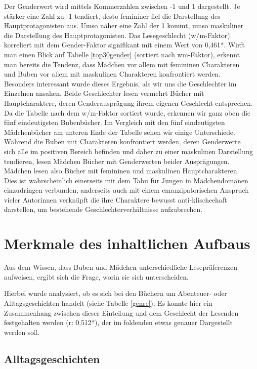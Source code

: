Der Genderwert wird mittels Kommerzahlen zwischen -1 und 1 dargestellt.
Je stärker eine Zahl zu -1 tendiert, desto femininer fiel die
Darstellung des Hauptprotagonisten aus. Umso näher eine Zahl der 1
kommt, umso maskuliner die Darstellung des Hauptprotagonisten. Das
Lesegeschlecht (w/m-Faktor) korreliert mit dem Gender-Faktor signifikant
mit einem Wert von 0,461*. Wirft man einen Blick auf Tabelle
\ref{top30gender} (sortiert nach wm-Faktor), erkennt man bereits die
Tendenz, dass Mädchen vor allem mit femininen Charakteren und Buben vor
allem mit maskulinen Charakteren konfrontiert werden. Besonders
interessant wurde dieses Ergebnis, als wir uns die Geschlechter im
Einzelnen ansahen. Beide Geschlechter lesen vermehrt Bücher mit
Hauptcharaktere, deren Genderausprägung ihrem eigenen Geschlecht
entsprechen. Da die Tabelle nach dem w/m-Faktor sortiert wurde, erkennen
wir ganz oben die fünf eindeutigsten Bubenbücher. Im Vergleich mit den
fünf eindeutigsten Mädchenbücher am unteren Ende der Tabelle sehen wir
einige Unterschiede. Während die Buben mit Charakteren konfrontiert
werden, deren Genderwerte sich alle im positiven Bereich befinden und
daher zu einer maskulinen Darstellung tendieren, lesen Mädchen Bücher
mit Genderwerten beider Ausprägungen. Mädchen lesen also Bücher mit
femininen und maskulinen Hauptcharakteren. Dies ist wahrscheinlich
einerseits mit dem Tabu für Jungen in Mädchendomänen einzudringen
verbunden, anderseits auch mit einem emanzipatorischen Anspruch vieler
Autorinnen verknüpft die ihre Charaktere bewusst anti-klischeehaft
darstellen, um bestehende Geschlechterverhältnisse aufzubrechen.



\section{Merkmale des inhaltlichen Aufbaus}

Aus dem Wissen, dass Buben und Mädchen unterschiedliche Lesepräferenzen
aufweisen, ergibt sich die Frage, worin sie sich unterscheiden.

Hierbei wurde analysiert, ob es sich bei den Büchern um Abenteuer- oder
Alltagsgeschichten handelt (siehe Tabelle \ref{genre}). Es konnte hier
ein Zusammenhang zwischen dieser Einteilung und dem Geschlecht der
Lesenden festgehalten werden (r: 0,512*), der im foldenden etwas genauer
Dargestellt werden soll.



\subsection{Alltagsgeschichten}

